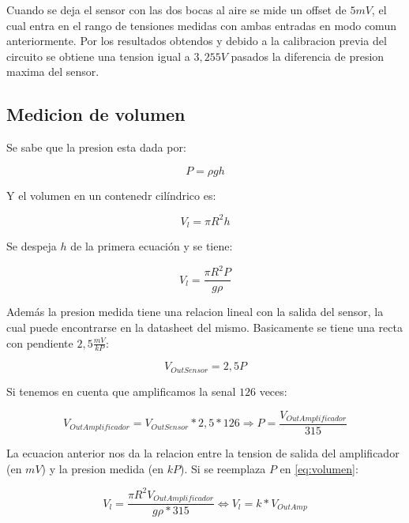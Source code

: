 Cuando se deja el sensor con las dos bocas al aire se mide un offset de $5mV$, el cual entra en el rango de tensiones medidas con ambas entradas en modo comun anteriormente. Por los resultados obtendos y debido a la calibracion previa del circuito se obtiene una tension igual a $3,255V$ pasados la diferencia de presion maxima del sensor. 


\subsection{Medicion de volumen}

Se sabe que la presion esta dada por:

\begin{equation}
P = \rho gh 
\end{equation}

Y el volumen en un contenedr cil\'indrico es:
 
\begin{equation}
V_l = \pi R^2h 
\end{equation}

Se despeja $h$ de la primera ecuaci\'on y se tiene:

\begin{equation}\label{eq:volumen}
V_l = \frac{\pi R^2P}{g\rho}
\end{equation} 

Adem\'as la presion medida tiene una relacion lineal con la salida del sensor, la cual puede encontrarse en la datasheet del mismo. Basicamente se tiene una recta con pendiente $2,5\frac{mV}{kP}$:

\begin{equation}
V_{OutSensor} = 2,5P
\end{equation}

Si tenemos en cuenta que amplificamos la senal $126$ veces:

\begin{equation}
V_{OutAmplificador} = V_{OutSensor}*2,5*126 \Longrightarrow P = \frac{V_{OutAmplificador}}{315}
\end{equation}

La ecuacion anterior nos da la relacion entre la tension de salida del amplificador (en $mV$) y la presion medida (en $kP$). Si se reemplaza $P$ en \ref{eq:volumen}:

\begin{equation}
V_l = \frac{\pi R^2V_{OutAmplificador}}{g\rho*315} \Longleftrightarrow V_l = k*V_{OutAmp}
\end{equation} 

